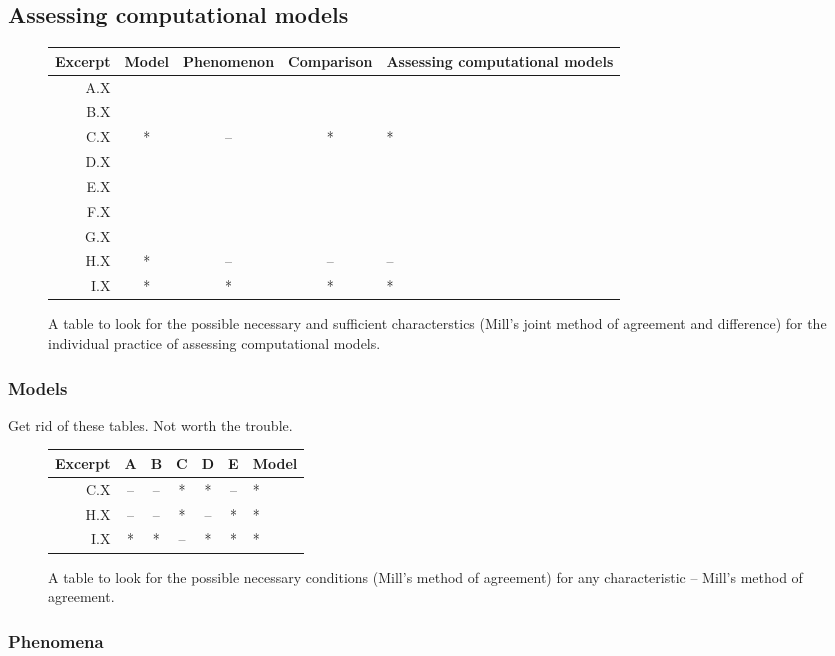 \documentclass{msuphddissertation}
\begin{document}
\begin{doublespace}
\subsection{Assessing computational models}

\begin{figure}\centering
  \begin{tabular}{ r | c | c | c | l}
    Excerpt & Model & Phenomenon & Comparison & Assessing computational models \\ \hline
    A.X &   &   &   &   \\
    B.X &   &   &   &   \\
    C.X & * & --  & * & * \\
    D.X  &   &   &   &   \\
    E.X &   &   &   &   \\
    F.X &   &   &   &   \\
    G.X &   &   &   &   \\
    H.X & * & -- & -- & -- \\
    I.X & * & * & * & * \\
  \end{tabular}\caption{A table to look for the possible necessary and sufficient characterstics (Mill's joint method of agreement and difference) for the individual practice of assessing computational models.}
\end{figure}

\subsubsection{Models}

Get rid of these tables.  Not worth the trouble.

\begin{figure}[ht]\centering
  \begin{tabular}{ r | c | c | c | c | c | l }
    Excerpt & A & B & C & D & E & Model \\ \hline
    C.X & -- & --  & * & * & -- & * \\
    H.X & -- & -- & * & -- & * & * \\
    I.X & * & * & -- & * & * & * \\
  \end{tabular}\caption{A table to look for the possible necessary conditions (Mill's method of agreement) for any characteristic -- Mill's method of agreement.}
\end{figure}

\subsubsection{Phenomena}


\end{doublespace}
\end{document}
